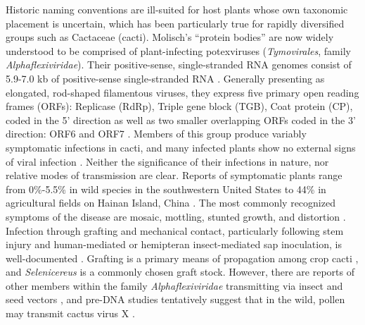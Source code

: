 \documentclass[fleqn,10pt,lineno]{wlpeerj}
\begin{document}
Historic naming conventions are ill-suited for host plants whose own taxonomic placement is uncertain, which has been particularly true for rapidly diversified groups such as Cactaceae (cacti).
Molisch's ``protein bodies'' are now widely understood to be comprised of plant-infecting potexviruses (\textit{Tymovirales}, family \textit{Alphaflexiviridae}).
Their positive-sense, single-stranded RNA genomes consist of 5.9-7.0 kb of positive-sense single-stranded RNA \citep{martelli_family_2007}.
Generally presenting as elongated, rod-shaped filamentous viruses, they express five primary open reading frames (ORFs): Replicase (RdRp), Triple gene block (TGB), Coat protein (CP), coded in the 5' direction as well as two smaller overlapping ORFs coded in the 3' direction: ORF6 and ORF7 \citep{martelli_family_2007}. 
Members of this group produce variably symptomatic infections in cacti, and many infected plants show no external signs of viral infection \citep{bos_symptoms_1977, liou_complete_2004}. 
Neither the significance of their infections in nature, nor relative modes of transmission are clear. 
Reports of symptomatic plants range from 0\%-5.5\% in wild species in the southwestern United States \citep{attathom_occurrence_1978} to 44\% in agricultural fields on Hainan Island, China \citep{peng_molecular_2016}.
The most commonly recognized symptoms of the disease are mosaic, mottling, stunted growth, and distortion \citep{attathom_occurrence_1978, maliarenko_cactus_2013, peng_molecular_2016}.
Infection through grafting and mechanical contact, particularly following stem injury and human-mediated or hemipteran insect-mediated sap inoculation, is well-documented \citep{liou_complete_2004,maliarenko_cactus_2013,park_detection_2018}.
Grafting is a primary means of propagation among crop cacti \citep{park_detection_2018}, and \textit{Selenicereus} is a commonly chosen graft stock.
However, there are reports of other members within the family \textit{Alphaflexiviridae} transmitting via insect and seed vectors \citep{martelli_family_2007}, and pre-DNA studies tentatively suggest that in the wild, pollen may transmit cactus virus X \citep{attathom_occurrence_1978}.
\end{document}
